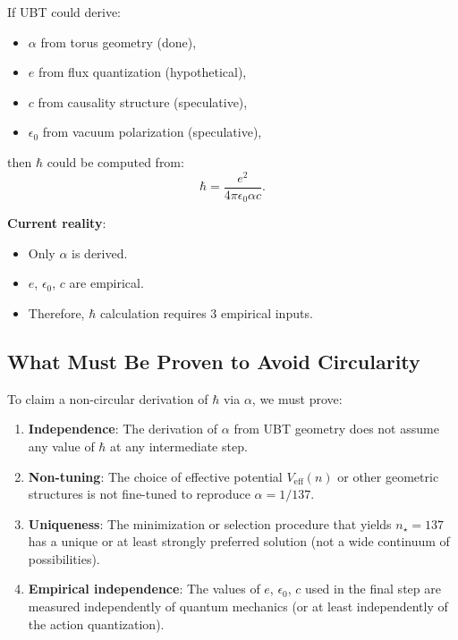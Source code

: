\documentclass[12pt]{article}
\begin{document}
If UBT could derive:
\begin{itemize}
\item $\alpha$ from torus geometry (done),
\item $e$ from flux quantization (hypothetical),
\item $c$ from causality structure (speculative),
\item $\epsilon_0$ from vacuum polarization (speculative),
\end{itemize}

then $\hbar$ could be computed from:
\[
\hbar = \frac{e^2}{4\pi \epsilon_0 \alpha c}.
\]

\textbf{Current reality}:
\begin{itemize}
\item Only $\alpha$ is derived.
\item $e$, $\epsilon_0$, $c$ are empirical.
\item Therefore, $\hbar$ calculation requires 3 empirical inputs.
\end{itemize}

\subsection{What Must Be Proven to Avoid Circularity}

To claim a non-circular derivation of $\hbar$ via $\alpha$, we must prove:

\begin{enumerate}
\item \textbf{Independence}: The derivation of $\alpha$ from UBT geometry does not assume any value of $\hbar$ at any intermediate step.

\item \textbf{Non-tuning}: The choice of effective potential $V_{\text{eff}}(n)$ or other geometric structures is not fine-tuned to reproduce $\alpha = 1/137$.

\item \textbf{Uniqueness}: The minimization or selection procedure that yields $n_\star = 137$ has a unique or at least strongly preferred solution (not a wide continuum of possibilities).

\item \textbf{Empirical independence}: The values of $e$, $\epsilon_0$, $c$ used in the final step are measured independently of quantum mechanics (or at least independently of the action quantization).
\end{enumerate}
\end{document}
